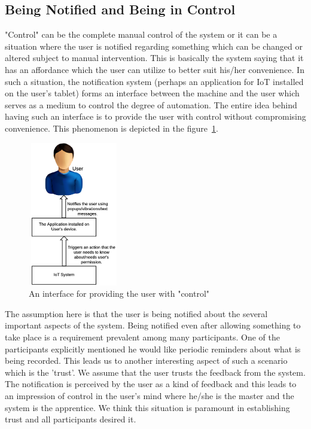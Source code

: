 \subsection{Being Notified and Being in Control}
"Control" can be the complete manual control of the system or it can be a situation where the user is notified regarding something which can be changed or altered subject to manual intervention. This is basically the system saying that it has an affordance which the user can utilize to better suit his/her convenience. In such a situation, the notification system (perhaps an application for IoT installed on the user's tablet) forms an interface between the machine and the user which serves as a medium to control the degree of automation. The entire idea behind having such an interface is to provide the user with control without compromising convenience. This phenomenon is depicted in the figure~\ref{fig:interface}.
\begin{figure}
	\centering
	\includegraphics[width=4cm, height=6.3cm]{figures/interface.png}
	\caption{An interface for providing the user with "control"}
	\label{fig:interface}
\end{figure}

The assumption here is that the user is being notified about the several important aspects of the system. Being notified even after allowing something to take place is a requirement prevalent among many participants. One of the participants explicitly mentioned he would like periodic reminders about what is being recorded. This leads us to another interesting aspect of such a scenario which is the 'trust'. We assume that the user trusts the feedback from the system. The notification is perceived by the user as a kind of feedback and this leads to an impression of control in the user's mind where he/she is the master and the system is the apprentice. We think this situation is paramount in establishing trust and all participants desired it.
